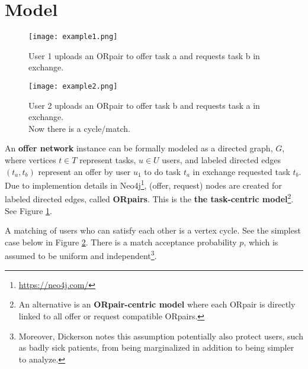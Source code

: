\documentclass[main.tex]{subfiles}
\begin{document}
%
%
%
%


\section{Model}

\begin{figure}
  \texttt{[image: example1.png]}
  \caption{User 1 uploads an ORpair to offer task a and requests task b in exchange.}
  \label{example1}
\end{figure}

\begin{figure}
  \texttt{[image: example2.png]}
  \caption{User 2 uploads an ORpair to offer task b and requests task a in exchange.
           \\Now there is a cycle/match.}
  \label{example2}
\end{figure}

An \textbf{offer network} instance can be formally modeled as a directed graph, $G$, where vertices $t \in T$ represent tasks, $u \in U$ users, and labeled directed edges $(t_a,t_b)$ represent an offer by user $u_1$ to do task $t_a$ in exchange requested task $t_b$. Due to implemention details in Neo4j\footnote{\url{https://neo4j.com/}}, (offer, request) nodes are created for labeled directed edges, called \textbf{ORpairs}. This is the \textbf{the task-centric model}\footnote{An alternative is an \textbf{ORpair-centric model} where each ORpair is directly linked to all offer or request compatible ORpairs.}.  See Figure \ref{example1}.

A matching of users who can satisfy each other is a vertex cycle. See the simplest case below in Figure \ref{example2}. There is a match acceptance probability $p$, which is assumed to be uniform and independent\footnote{Moreover, Dickerson \cite{Dick} notes this assumption potentially also protect users, such as badly sick patients, from being marginalized in addition to being simpler to analyze.}.
\end{document}
